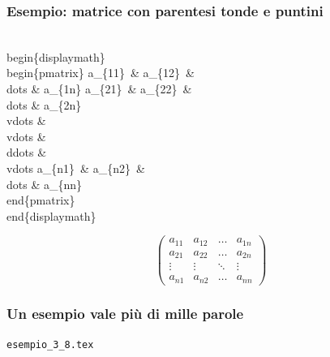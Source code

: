 \documentclass[svgnames,%
	ucs,%
	pdftex]{guitbeamer}
\begin{document}
\begin{frame}
  \frametitle{Esempio: matrice con parentesi tonde e puntini}
	\begin{LaTeXcode}
		\\begin\{displaymath\}\n
		\alert{\\begin\{pmatrix\}}\n 
		\hspace*{5ex} a\_\{11\}\ \& a\_\{12\}\ \& \\dots \& a\_\{1n\}\bs\bs\n
		\hspace*{5ex} a\_\{21\}\ \& a\_\{22\}\ \& \alert{\\dots} \& a\_\{2n\} \bs\bs\n
		\hspace*{5ex} \\vdots \& \\vdots \& \alert{\\ddots} \& \alert{\\vdots} \bs\bs\n
		\hspace*{5ex} a\_\{n1\}\ \& a\_\{n2\}\ \& \\dots \& a\_\{nn\}\bs\bs\n 
		\alert{\\end\{pmatrix\}}\n
		\\end\{displaymath\}
	\end{LaTeXcode}
	\begin{LaTeXoutput}
		\begin{displaymath}
		\begin{pmatrix} 
		a_{11} & a_{12} & \dots & a_{1n} \\
		a_{21} & a_{22} & \dots & a_{2n} \\
		\vdots & \vdots & \ddots & \vdots \\
		a_{n1} & a_{n2} & \dots & a_{nn} 
		\end{pmatrix}
		\end{displaymath} 
	\end{LaTeXoutput}
\end{frame}
\begin{frame}
  \frametitle{Un esempio vale pi\`u di mille parole}
	\begin{center}
		\alert{\texttt{esempio\_3\_8.tex}}
	\end{center}
\end{frame}
\end{document}
